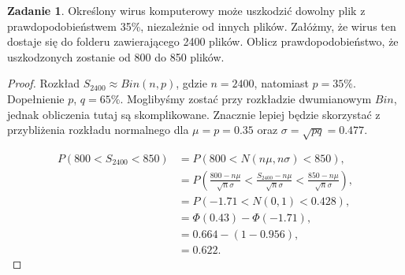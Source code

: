 \documentclass[11pt]{article}
\theoremstyle{definition}
\newtheorem{zadanie}{Zadanie}
\begin{document}
\begin{zadanie}
    Określony wirus komputerowy może uszkodzić dowolny plik z prawdopodobieństwem 35\%, niezależnie od innych plików. Załóżmy, że wirus ten dostaje się do folderu zawierającego 2400 plików. Oblicz prawdopodobieństwo, że uszkodzonych zostanie od 800 do 850 plików.
\end{zadanie}
\begin{proof}
    Rozkład $S_{2400} \approx Bin(n,p)$, gdzie $n=2400$, natomiast $p=35\%$. Dopełnienie $p$, $q=65\%$. Moglibyśmy zostać przy rozkładzie dwumianowym $Bin$, jednak obliczenia tutaj są skomplikowane. Znacznie lepiej będzie skorzystać z przybliżenia rozkładu normalnego dla $\mu=p=0.35$ oraz $\sigma=\sqrt{pq}=0.477$.

    \begin{align*}
        P(800<S_{2400}<850) & = P(800<N(n\mu,n\sigma)<850),                                                                                  \\
                            & = P(\frac{800-n\mu}{\sqrt{n}\sigma} < \frac{S_{2400}-n\mu}{\sqrt{n}\sigma} < \frac{850-n\mu}{\sqrt{n}\sigma}), \\
                            & = P(-1.71 < N(0,1) < 0.428),                                                                                  \\
                            & = \Phi(0.43) - \Phi(-1.71),                                                                                    \\
                            & = 0.664 - (1 - 0.956),                                                                                         \\
                            & = 0.622.
    \end{align*}
\end{proof}
\end{document}
